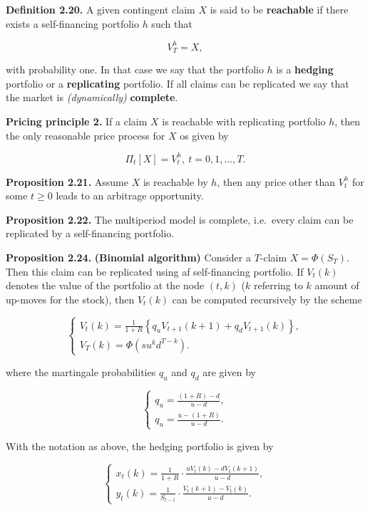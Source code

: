 \documentclass[
]{article}
\begin{document}
\textbf{Definition 2.20.} A given contingent claim \(X\) is said to be
\textbf{reachable} if there exists a self-financing portfolio \(h\) such
that

\[
V_T^h=X,
\]

with probability one. In that case we say that the portfolio \(h\) is a
\textbf{hedging} portfolio or a \textbf{replicating} portfolio. If all
claims can be replicated we say that the market is \emph{(dynamically)}
\textbf{complete}.

\textbf{Pricing principle 2.} If a claim \(X\) is reachable with
replicating portfolio \(h\), then the only reasonable price process for
\(X\) os given by

\[
\Pi_t[X]=V_t^h,\ t=0,1,...,T.
\]

\textbf{Proposition 2.21.} Assume \(X\) is reachable by \(h\), then any
price other than \(V_t^h\) for some \(t\ge 0\) leads to an arbitrage
opportunity.

\textbf{Proposition 2.22.} The multiperiod model is complete, i.e.~every
claim can be replicated by a self-financing portfolio.

\textbf{Proposition 2.24.} \textbf{(Binomial algorithm)} Consider a
\(T\)-claim \(X=\Phi(S_T)\). Then this claim can be replicated using af
self-financing portfolio. If \(V_t(k)\) denotes the value of the
portfolio at the node \((t,k)\) (\(k\) referring to \(k\) amount of
up-moves for the stock), then \(V_t(k)\) can be computed recursively by
the scheme

\[
\left\{\begin{matrix}V_t(k)=\frac{1}{1+R}\left\{q_uV_{t+1}(k+1)+q_dV_{t+1}(k)\right\},\\ V_T(k)=\Phi(su^kd^{T-k}).\end{matrix}\right.
\]

where the martingale probabilities \(q_u\) and \(q_d\) are given by

\[
\left\{\begin{matrix}q_u=\frac{(1+R)-d}{u-d},\\ q_u=\frac{u-(1+R)}{u-d}.\end{matrix}\right.
\]

With the notation as above, the hedging portfolio is given by

\[
\left\{\begin{matrix}x_t(k)=\frac{1}{1+R}\cdot\frac{uV_t(k)-dV_t(k+1)}{u-d},\\ y_t(k)=\frac{1}{S_{t-1}}\cdot\frac{V_t(k+1)-V_t(k)}{u-d}.\end{matrix}\right.
\]
\end{document}
